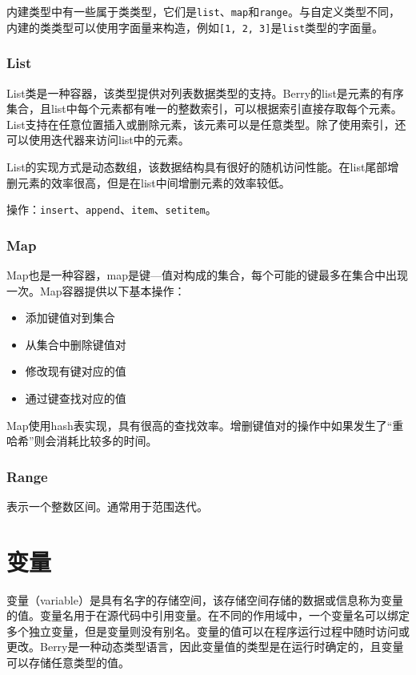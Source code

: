 内建类型中有一些属于类类型，它们是\texttt{list}、\texttt{map}和\texttt{range}。与自定义类型不同，内建的类类型可以使用字面量来构造，例如\texttt{[1, 2, 3]}是\texttt{list}类型的字面量。

\subsubsection{List}

List类是一种容器，该类型提供对列表数据类型的支持。Berry的list是元素的有序集合，且list中每个元素都有唯一的整数索引，可以根据索引直接存取每个元素。List支持在任意位置插入或删除元素，该元素可以是任意类型。除了使用索引，还可以使用迭代器来访问list中的元素。

List的实现方式是动态数组，该数据结构具有很好的随机访问性能。在list尾部增删元素的效率很高，但是在list中间增删元素的效率较低。

操作：\texttt{insert}、\texttt{append}、\texttt{item}、\texttt{setitem}。

\subsubsection{Map}

Map也是一种容器，map是键—值对构成的集合，每个可能的键最多在集合中出现一次。Map容器提供以下基本操作：
\begin{itemize}
    \item 添加键值对到集合
    \item 从集合中删除键值对
    \item 修改现有键对应的值
    \item 通过键查找对应的值
\end{itemize}

Map使用hash表实现，具有很高的查找效率。增删键值对的操作中如果发生了``重哈希''则会消耗比较多的时间。

\subsubsection{Range}

表示一个整数区间。通常用于范围迭代。

\section{变量}

变量（variable）是具有名字的存储空间，该存储空间存储的数据或信息称为变量的值。变量名用于在源代码中引用变量。在不同的作用域中，一个变量名可以绑定多个独立变量，但是变量则没有别名。变量的值可以在程序运行过程中随时访问或更改。Berry是一种动态类型语言，因此变量值的类型是在运行时确定的，且变量可以存储任意类型的值。


